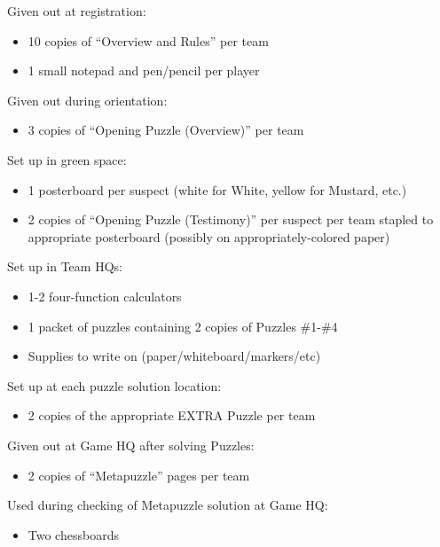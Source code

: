 
\begin{printList}


\noindent
Given out at registration:

\begin{itemize}
  \item
  10 copies of ``Overview and Rules'' per team
  \item
  1 small notepad and pen/pencil per player
\end{itemize}

\noindent
Given out during orientation:

\begin{itemize}
  \item
  3 copies of ``Opening Puzzle (Overview)'' per team
\end{itemize}


\noindent
Set up in green space:

\begin{itemize}
  \item
  1 posterboard per suspect (white for White, yellow for Mustard, etc.)
  \item
  2 copies of ``Opening Puzzle (Testimony)'' per suspect per team
  stapled to appropriate posterboard
  (possibly on appropriately-colored paper)
\end{itemize}


\noindent
Set up in Team HQs:

\begin{itemize}
  \item
  1-2 four-function calculators
  \item
  1 packet of puzzles containing 2 copies of Puzzles \#1-\#4
  \item
  Supplies to write on (paper/whiteboard/markers/etc)
\end{itemize}

\noindent
Set up at each puzzle solution location:

\begin{itemize}
  \item
  2 copies of the appropriate EXTRA Puzzle per team
\end{itemize}


\noindent
Given out at Game HQ after solving Puzzles:

\begin{itemize}
  \item
  2 copies of ``Metapuzzle'' pages per team
\end{itemize}

\noindent
Used during checking of Metapuzzle solution at Game HQ:

\begin{itemize}
  \item
  Two chessboards
\end{itemize}

\end{printList}
